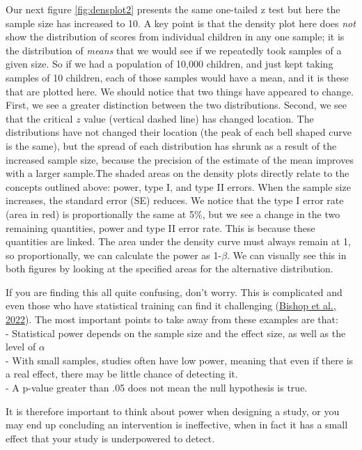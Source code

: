 \documentclass{krantz}
\begin{document}
Our next figure \ref{fig:densplot2} presents the same one-tailed z test but here the sample size has increased to 10. A key point is that the density plot here does \emph{not} show the distribution of scores from individual children in any one sample; it is the distribution of \emph{means} that we would see if we repeatedly took samples of a given size. So if we had a population of 10,000 children, and just kept taking samples of 10 children, each of those samples would have a mean, and it is these that are plotted here. We should notice that two things have appeared to change. First, we see a greater distinction between the two distributions. Second, we see that the critical \(z\) value (vertical dashed line) has changed location. The distributions have not changed their location (the peak of each bell shaped curve is the same), but the spread of each distribution has shrunk as a result of the increased sample size, because the precision of the estimate of the mean improves with a larger sample.The shaded areas on the density plots directly relate to the concepts outlined above: power, type I, and type II errors. When the sample size increases, the standard error (SE) reduces. We notice that the type I error rate (area in red) is proportionally the same at 5\%, but we see a change in the two remaining quantities, power and type II error rate. This is because these quantities are linked. The area under the density curve must always remain at 1, so proportionally, we can calculate the power as 1-\(\beta\). We can visually see this in both figures by looking at the specified areas for the alternative distribution.

If you are finding this all quite confusing, don't worry. This is complicated and even those who have statistical training can find it challenging (\protect\hyperlink{ref-bishop2022a}{Bishop et al., 2022}). The most important points to take away from these examples are that:\\
- Statistical power depends on the sample size and the effect size, as well as the level of \(\alpha\)\\
- With small samples, studies often have low power, meaning that even if there is a real effect, there may be little chance of detecting it.\\
- A p-value greater than .05 does not mean the null hypothesis is true.

It is therefore important to think about power when designing a study, or you may end up concluding an intervention is ineffective, when in fact it has a small effect that your study is underpowered to detect.
\end{document}
